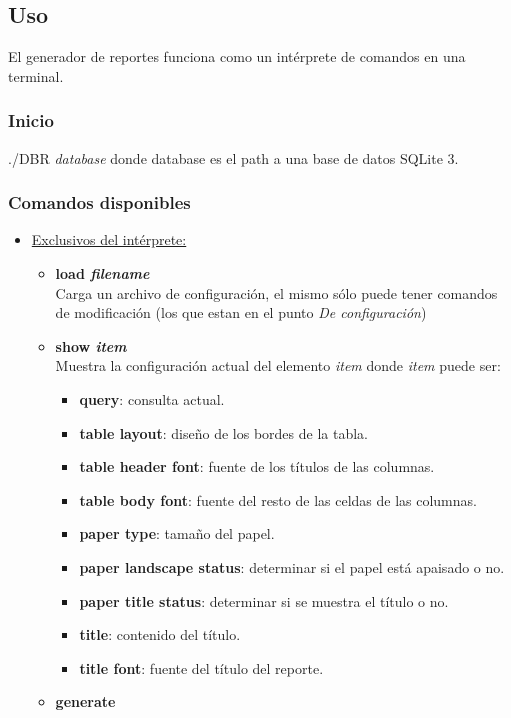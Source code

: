 \documentclass[a4paper,12pt]{article}
\begin{document}
	\subsection*{Uso\\}
	El generador de reportes funciona como un intérprete de comandos en una terminal.
	\subsubsection*{Inicio\\}
	./DBR \textit{database} donde {database} es el path a una base de datos SQLite 3.
	\subsubsection*{Comandos disponibles}
	\begin{itemize}
	\item \underline{Exclusivos del intérprete:}
		\begin{itemize}
		\item \textbf{load \textit{filename}}\\
		Carga un archivo de configuración, el mismo sólo puede tener comandos de modificación (los que estan en el punto \textit{De configuración})%
		\item \textbf{show \textit{item}}\\
		Muestra la configuración actual del elemento \textit{item} donde \textit{item} puede ser:
			\begin{itemize}
			\item \textbf{query}: consulta actual.
			\item \textbf{table layout}: diseño de los bordes de la tabla.
			\item \textbf{table header font}: fuente de los títulos de las columnas.
			\item \textbf{table body font}: fuente del resto de las celdas de las columnas.
			\item \textbf{paper type}: tamaño del papel.
			\item \textbf{paper landscape status}: determinar si el papel está apaisado o no.
			\item \textbf{paper title status}: determinar si se muestra el título o no.
			\item \textbf{title}: contenido del título.
			\item \textbf{title font}: fuente del título del reporte.
			\end{itemize}
		\item \textbf{generate}\\

\end{itemize}
\end{itemize}
\end{document}
